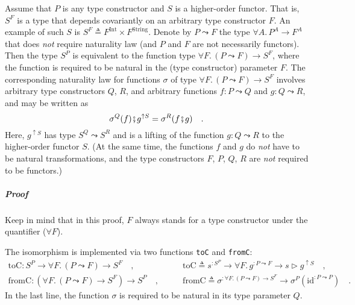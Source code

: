Assume that $P$ is any type constructor and $S$ is a higher-order
functor.
That is, $S^{F}$ is a type that depends covariantly on an arbitrary
type constructor $F$. An example of such $S$ is $S^{F}\triangleq F^{\text{Int}}\times F^{\text{String}}$.
Denote by $P\leadsto F$ the type $\forall A.\,P^{A}\rightarrow F^{A}$
that does \emph{not} require naturality law (and $P$ and $F$ are
not necessarily functors). Then the type $S^{P}$ is equivalent to
the function type $\forall F.\,(P\leadsto F)\rightarrow S^{F}$, where
the function is required to be natural in the (type constructor) parameter
$F$. The corresponding naturality law for functions $\sigma$ of
type $\forall F.\,(P\leadsto F)\rightarrow S^{F}$ involves arbitrary
type constructors $Q$, $R$, and arbitrary functions $f:P\leadsto Q$
and $g:Q\leadsto R$, and may be written as
\begin{equation}
\sigma^{Q}(f)\bef g^{\uparrow S}=\sigma^{R}(f\bef g)\quad.\label{eq:assumed-naturality-of-argument-sigma}
\end{equation}
Here, $g^{\uparrow S}$ has type $S^{Q}\leadsto S^{R}$ and is a lifting
of the function $g:Q\leadsto R$ to the higher-order functor $S$.
(At the same time, the functions $f$ and $g$ do \emph{not} have
to be natural transformations, and the type constructors $F$, $P$,
$Q$, $R$ are \emph{not} required to be functors.)

\subparagraph{Proof}

Keep in mind that in this proof, $F$ always stands for a type constructor
under the quantifier ($\forall F$).

The isomorphism is implemented via two functions \lstinline!toC!
and \lstinline!fromC!:
\begin{align*}
\text{toC}:S^{P}\rightarrow\forall F.\,(P\leadsto F)\rightarrow S^{F}\quad, & \quad\quad\text{toC}\triangleq s^{:S^{P}}\rightarrow\forall F.\,g^{:P\leadsto F}\rightarrow s\triangleright g^{\uparrow S}\quad,\\
\text{fromC}:(\forall F.\,(P\leadsto F)\rightarrow S^{F})\rightarrow S^{P}\quad, & \quad\quad\text{fromC}\triangleq\sigma^{:\forall F.\,(P\leadsto F)\rightarrow S^{F}}\rightarrow\sigma^{P}(\text{id}^{:P\leadsto P})\quad.
\end{align*}
In the last line, the function $\sigma$ is required to be natural
in its type parameter $Q$.

